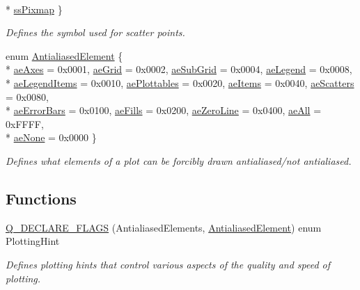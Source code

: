\begin{DoxyCompactItemize}
\\*
\hyperlink{a00143_af66d0711d42fe78d96c28abadc67f26fa3046d385199d0903dd492322ba133e75}{ss\+Pixmap}
 \}
\begin{DoxyCompactList}\small\item\em Defines the symbol used for scatter points. \end{DoxyCompactList}\item 
enum \hyperlink{a00143_ae55dbe315d41fe80f29ba88100843a0c}{Antialiased\+Element} \{ \\*
\hyperlink{a00143_ae55dbe315d41fe80f29ba88100843a0caefa92e89cd37f8a081fd2075aa1af73f}{ae\+Axes} = 0x0001, 
\hyperlink{a00143_ae55dbe315d41fe80f29ba88100843a0ca4fbb37118d62288af0ca601ff2b07a2f}{ae\+Grid} = 0x0002, 
\hyperlink{a00143_ae55dbe315d41fe80f29ba88100843a0caaedf83369188a15a69f92bb1d85ca97b}{ae\+Sub\+Grid} = 0x0004, 
\hyperlink{a00143_ae55dbe315d41fe80f29ba88100843a0ca9e0127a6361b5d0596b031a482c5cf97}{ae\+Legend} = 0x0008, 
\\*
\hyperlink{a00143_ae55dbe315d41fe80f29ba88100843a0ca1aca7a50c1b95403958733a4acafe773}{ae\+Legend\+Items} = 0x0010, 
\hyperlink{a00143_ae55dbe315d41fe80f29ba88100843a0ca4145e4251b0cf2dbedabeea0a38f84f6}{ae\+Plottables} = 0x0020, 
\hyperlink{a00143_ae55dbe315d41fe80f29ba88100843a0caf7712a85d6b0c75b24301d2fe9484db3}{ae\+Items} = 0x0040, 
\hyperlink{a00143_ae55dbe315d41fe80f29ba88100843a0cae45ed8cd167bffe27d7f40da4bc17e9c}{ae\+Scatters} = 0x0080, 
\\*
\hyperlink{a00143_ae55dbe315d41fe80f29ba88100843a0ca9dcf3882cb321bb305f71fdc0f09f63d}{ae\+Error\+Bars} = 0x0100, 
\hyperlink{a00143_ae55dbe315d41fe80f29ba88100843a0ca788810f0aa930137de6ad6cc6d83d354}{ae\+Fills} = 0x0200, 
\hyperlink{a00143_ae55dbe315d41fe80f29ba88100843a0ca261f8ea78cf3c9561726223ffa33dc12}{ae\+Zero\+Line} = 0x0400, 
\hyperlink{a00143_ae55dbe315d41fe80f29ba88100843a0caa897c232a0ffc8368e7c100ffc59ef31}{ae\+All} = 0x\+F\+F\+F\+F, 
\\*
\hyperlink{a00143_ae55dbe315d41fe80f29ba88100843a0caa9e90d81896358757d94275aeaa58f6a}{ae\+None} = 0x0000
 \}
\begin{DoxyCompactList}\small\item\em Defines what elements of a plot can be forcibly drawn antialiased/not antialiased. \end{DoxyCompactList}\end{DoxyCompactItemize}
\subsection*{Functions}
\begin{DoxyCompactItemize}
\item 
\hyperlink{a00143_ad872998745107257e1136d548498d18c}{Q\+\_\+\+D\+E\+C\+L\+A\+R\+E\+\_\+\+F\+L\+A\+G\+S} (Antialiased\+Elements, \hyperlink{a00143_ae55dbe315d41fe80f29ba88100843a0c}{Antialiased\+Element}) enum Plotting\+Hint
\begin{DoxyCompactList}\small\item\em Defines plotting hints that control various aspects of the quality and speed of plotting. \end{DoxyCompactList}\end{DoxyCompactItemize}



